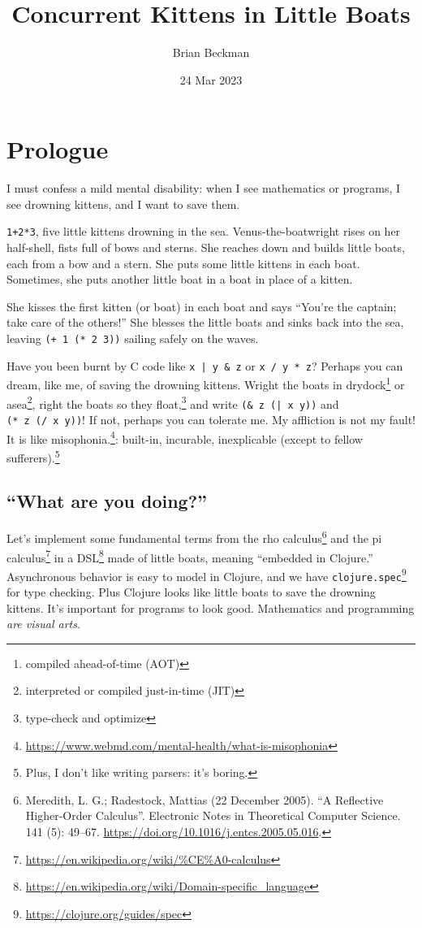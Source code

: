 \documentclass[10pt,oneside,x11names]{article}
\author{Brian Beckman}
\date{24 Mar 2023}
\title{Concurrent Kittens in Little Boats}
\theoremstyle{definition}
\theoremstyle{warning}
\begin{document}
\maketitle
\setcounter{tocdepth}{2}
\tableofcontents

\setlength\parindent{0pt}

\clearpage
\section{Prologue}
\label{sec:org154cb3d}

I must confess a mild mental disability: when I see
mathematics or programs, I see drowning kittens, and I want to save them.

\texttt{1+2*3}, five little kittens drowning in the sea.
Venus-the-boatwright rises on her half-shell, fists full of bows
and sterns. She reaches down and builds little boats, each from a
bow and a stern. She puts some little kittens in each boat.
Sometimes, she puts another little boat in a boat in place of a
kitten.

She kisses the first kitten (or boat) in each boat and says
``You're the captain; take care of the others!'' She blesses the
little boats and sinks back into the sea, leaving \texttt{(+ 1 (* 2 3))}
sailing safely on the waves.

Have you been burnt by C code like \texttt{x | y \& z} or \texttt{x / y * z}?
Perhaps you can dream, like me, of saving the drowning kittens.
Wright the boats in drydock\footnote{compiled ahead-of-time (AOT)} or
asea\footnote{interpreted or compiled just-in-time (JIT)}, right
the boats so they float,\footnote{type-check and optimize} and write
\texttt{(\& z (| x y))} and \texttt{(* z (/ x y))}! If not, perhaps you can
tolerate me. My affliction is not my fault! It is like
misophonia.\footnote{\url{https://www.webmd.com/mental-health/what-is-misophonia}}:
built-in, incurable, inexplicable (except to fellow
sufferers).\footnote{Plus, I don't like writing parsers: it's boring.}

\subsection{``What are you doing?''}
\label{sec:orgd1c558f}

Let's implement some fundamental terms from the rho calculus\footnote{Meredith, L. G.; Radestock, Mattias (22 December 2005). ``A Reflective Higher-Order Calculus''. Electronic Notes in Theoretical Computer Science. 141 (5): 49–67. \url{https://doi.org/10.1016/j.entcs.2005.05.016}.}
and the pi calculus\footnote{\url{https://en.wikipedia.org/wiki/\%CE\%A0-calculus}\label{org4730b45}}
in a DSL\footnote{\url{https://en.wikipedia.org/wiki/Domain-specific\_language}}
made of little boats, meaning ``embedded in Clojure.'' Asynchronous
behavior is easy to model in Clojure, and we have
\texttt{clojure.spec}\footnote{\url{https://clojure.org/guides/spec}} for type
checking. Plus Clojure looks like little boats to save
the drowning kittens. It's important for programs to look good.
Mathematics and programming \emph{are visual arts}.
\end{document}
